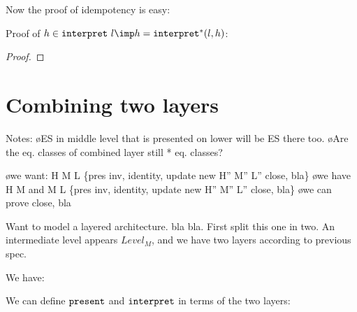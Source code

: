 Now the proof of idempotency is easy:

Proof of $h \in \interpret~l \imp h = \interpret^* (l,h)$:

\begin{proof}
\end{proof}
\ec












%																
%																
%																
\section{Combining two layers}

Notes:
\bl
\o ES in middle level that is presented on lower will be ES there too.
\o Are the eq. classes of combined layer still * eq. classes?
\el

\bl
\o we want: H M L \{pres inv, identity, update \rarr new H'' M'' L'' close, bla\}
\o we have H M and M L  \{pres inv, identity, update \rarr new H'' M'' L'' close, bla\}
\o we can prove close, bla
\el

Want to model a layered architecture. bla bla. First split this one in two. An intermediate level appears $Level_M$, and we have two layers according to previous spec. 

We have: 

We can define ${\tt present}$ and ${\tt interpret}$ in terms of the two layers:


